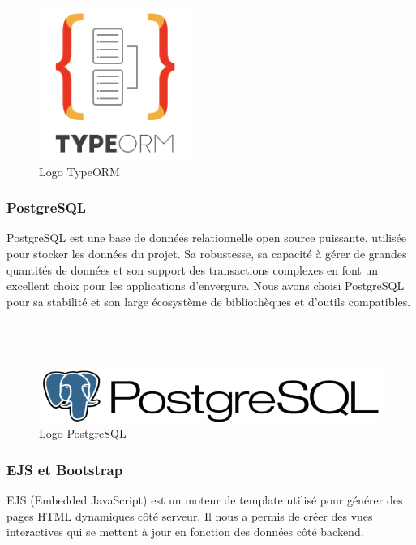 \begin{figure}[H]
\begin{center}
\includegraphics[width=5cm]{assets/presentation/TypeORM.png}
\end{center}
\caption{Logo TypeORM}
\end{figure}

\subsubsection*{PostgreSQL}
PostgreSQL est une base de données relationnelle open source puissante, utilisée pour stocker les données du projet. Sa robustesse, sa capacité à gérer de grandes quantités de données et son support des transactions complexes en font un excellent choix pour les applications d'envergure. Nous avons choisi PostgreSQL pour sa stabilité et son large écosystème de bibliothèques et d'outils compatibles.\\\\\\\\

\begin{figure}[H]
\begin{center}
\includegraphics[width=13cm]{assets/presentation/PostgreSQL_logo_Postgre_SQL-700x108.png}
\end{center}
\caption{Logo PostgreSQL}
\end{figure}


\subsubsection*{EJS et Bootstrap}
EJS (Embedded JavaScript) est un moteur de template utilisé pour générer des pages HTML dynamiques côté serveur. Il nous a permis de créer des vues interactives qui se mettent à jour en fonction des données côté backend. 

